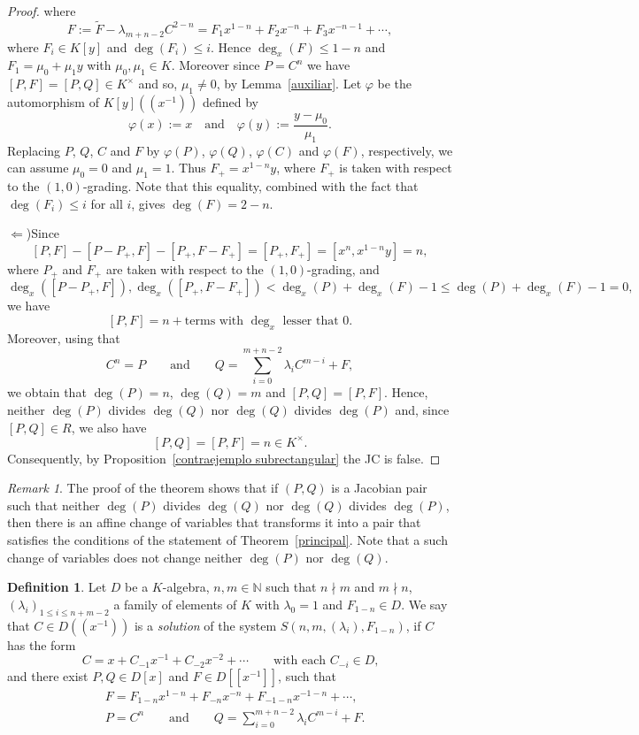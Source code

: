 \documentclass[reqno,a4paper]{amsart}
\theoremstyle{definition}
\newtheorem{definition}[theorem]{Definition}
\theoremstyle{remark}
\newtheorem{remark}[theorem]{Remark}
\begin{document}
\begin{proof}
where
\begin{equation}
F := \tilde{F} - \lambda_{m+n-2} C^{2-n} = F_1 x^{1-n}+F_2 x^{-n}+F_3 x^{-n-1} +\cdots,\label{eqq3}
\end{equation}
where $F_i\in K[y]$ and $\deg(F_i)\le i$. Hence $\deg_x(F)\le 1-n$ and $F_1=\mu_0+\mu_1 y$
with $\mu_0,\mu_1\in K$. Moreover since $P = C^n$ we have $[P,F] = [P,Q]\in K^{\times}$
and so, $\mu_1\ne 0$, by Lemma~\ref{auxiliar}. Let $\varphi$ be the automorphism of
$K[y]((x^{-1}))$ defined by
$$
\varphi(x):=x\quad\text{and}\quad \varphi(y):=\frac{y-\mu_0}{\mu_1}.
$$
Replacing $P$, $Q$, $C$ and $F$ by $\varphi(P)$, $\varphi(Q)$, $\varphi(C)$ and $\varphi(F)$,
respectively, we can assume $\mu_0=0$ and $\mu_1=1$. Thus $F_+=x^{1-n}y$, where $F_+$ is
taken with respect to the $(1,0)$-grading. Note that this equality, combined with the
fact that $\deg(F_i)\le i$ for all $i$, gives $\deg(F) = 2-n$.

\smallskip

\noindent $\Leftarrow$)\enspace Since
$$
[P,F] - [P-P_+,F] - [P_+,F-F_+] = [P_+,F_+] = [x^n,x^{1-n}y] = n,
$$
where $P_+$ and $F_+$ are taken with respect to the $(1,0)$-grading, and
$$
\deg_x([P\!-\!P_+,F]),\deg_x([P_+,F\!-\!F_+])<\deg_x(P)\!+\!\deg_x(F)\!-\!1\le \deg(P)\!+\!\deg_x(F)\!-\!1 =0,
$$
we have
$$
[P,F] = n + \text{terms with $\deg_x$ lesser that $0$.}
$$
Moreover, using that
$$
C^n=P\qquad\text{and}\qquad Q=\sum_{i=0}^{m+n-2}\lambda_i C^{m-i}+F,
$$
we obtain that $\deg(P) = n$, $\deg(Q) = m$ and $[P,Q] = [P,F]$. Hence, neither $\deg(P)$
divides $\deg(Q)$ nor $\deg(Q)$ divides $\deg(P)$ and, since $[P,Q]\in R$, we also have
$$
[P,Q] = [P,F] = n\in K^{\times}.
$$
Consequently, by Proposition~\ref{contraejemplo subrectangular} the JC is false.
\end{proof}

\begin{remark}\label{re 1.9} The proof of the theorem shows that if $(P,Q)$ is a Jacobian
pair such that neither $\deg(P)$ divides $\deg(Q)$ nor $\deg(Q)$ divides $\deg(P)$, then
there is an affine change of variables that transforms it into a pair that satisfies the
conditions of the statement of Theorem~\ref{principal}. Note that a such change of
variables does not change neither $\deg(P)$ nor $\deg(Q)$.
\end{remark}

\begin{definition}\label{solucion de sistema} Let $D$ be a $K$-algebra, $n,m\in\mathds{N}$
such that $n\nmid m$ and $m\nmid n$, $(\lambda_i)_{1\le i\le n+m-2}$ a family of elements
of $K$ with $\lambda_0=1$ and $F_{1-n}\in D$. We say that $C \in D((x^{-1}))$ is a
{\em solution} of the system $S(n,m,(\lambda_i),F_{1-n})$, if $C$ has the form
$$
C = x + C_{-1}x^{-1}+ C_{-2}x^{-2} + \cdots \qquad\text{with each $C_{-i}\in D$,}
$$
and there exist $P,Q\in D[x]$ and $F \in D[[x^{-1}]]$, such that
\begin{align}
& F = F_{1-n} x^{1-n} + F_{-n} x^{-n} + F_{-1-n} x^{-1-n} +\cdots,\label{forma de F}\\
%
&P=C^n\qquad\text{and}\qquad Q=\sum_{i=0}^{m+n-2}\lambda_i C^{m-i}+F.\label{forma de P y de Q}
\end{align}
\end{definition}
\end{document}
